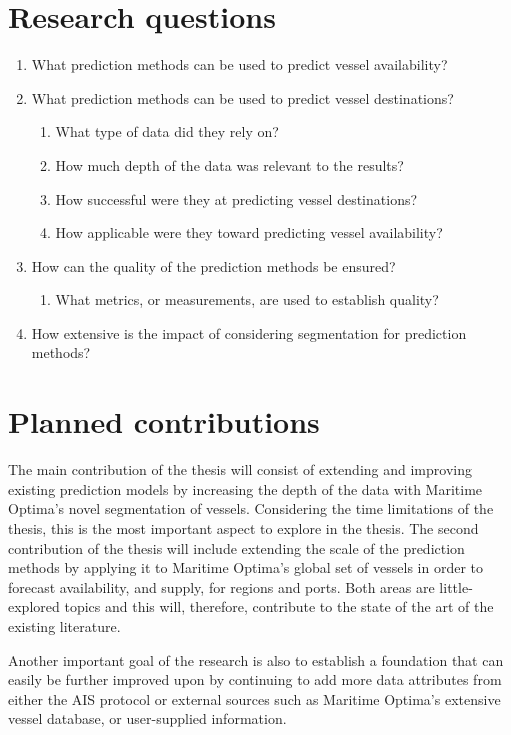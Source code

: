 \section{Research questions}
\label{sec:research_questions}


\begin{enumerate}
    \item What prediction methods can be used to predict vessel availability?
    \item What prediction methods can be used to predict vessel destinations?
    \begin{enumerate}
        \item What type of data did they rely on?
        \item How much depth of the data was relevant to the results?
        \item How successful were they at predicting vessel destinations?
        \item How applicable were they toward predicting vessel availability?
    \end{enumerate}
    \item How can the quality of the prediction methods be ensured?
    \begin{enumerate}
        \item What metrics, or measurements, are used to establish quality?
    \end{enumerate}
    \item How extensive is the impact of considering segmentation for prediction methods?
\end{enumerate}

\section{Planned contributions}

The main contribution of the thesis will consist of extending and improving existing prediction models by increasing the depth of the data with Maritime Optima’s novel segmentation of vessels. Considering the time limitations of the thesis, this is the most important aspect to explore in the thesis. The second contribution of the thesis will include extending the scale of the prediction methods by applying it to Maritime Optima’s global set of vessels in order to forecast availability, and supply, for regions and ports. Both areas are little-explored topics and this will, therefore, contribute to the state of the art of the existing literature.


Another important goal of the research is also to establish a foundation that can easily be further improved upon by continuing to add more data attributes from either the AIS protocol or external sources such as Maritime Optima’s extensive vessel database, or user-supplied information.
